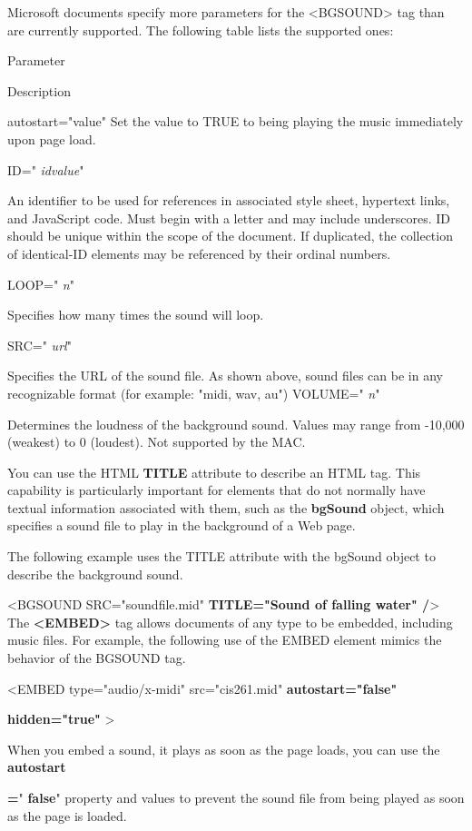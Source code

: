 \documentclass[
]{article}
\begin{document}
Microsoft documents specify more parameters for the
\textless BGSOUND\textgreater{} tag than are currently supported. The
following table lists the supported ones:

Parameter

Description

autostart="value" Set the value to TRUE to being playing the music
immediately upon page load.

ID=" \emph{idvalue}"

An identifier to be used for references in associated style sheet,
hypertext links, and JavaScript code. Must begin with a letter and may
include underscores. ID should be unique within the scope of the
document. If duplicated, the collection of identical-ID elements may be
referenced by their ordinal numbers.

LOOP=" \emph{n}"

Specifies how many times the sound will loop.

SRC=" \emph{url}"

Specifies the URL of the sound file. As shown above, sound files can be
in any recognizable format (for example: "midi, wav, au") VOLUME="
\emph{n}"

Determines the loudness of the background sound. Values may range from
-10,000 (weakest) to 0 (loudest). Not supported by the MAC.

You can use the HTML \textbf{TITLE} attribute to describe an HTML tag.
This capability is particularly important for elements that do not
normally have textual information associated with them, such as the
\textbf{bgSound} object, which specifies a sound file to play in the
background of a Web page.

The following example uses the TITLE attribute with the bgSound object
to describe the background sound.

\textless BGSOUND SRC="soundfile.mid" \textbf{TITLE="Sound of falling
water" /}\textgreater{} The \textbf{\textless EMBED\textgreater{}} tag
allows documents of any type to be embedded, including music files. For
example, the following use of the EMBED element mimics the behavior of
the BGSOUND tag.

\textless EMBED type="audio/x-midi" src="cis261.mid"
\textbf{autostart="false"}

\textbf{hidden="true"} \textgreater{}

When you embed a sound, it plays as soon as the page loads, you can use
the \textbf{autostart}

\textbf{=}" \textbf{false}" property and values to prevent the sound
file from being played as soon as the page is loaded.
\end{document}

